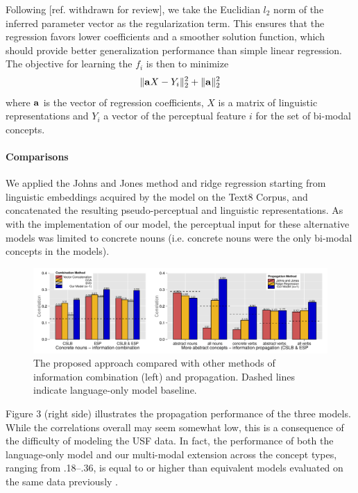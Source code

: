 \documentclass[11pt]{article}
\begin{document}
Following [ref. withdrawn for review], we take the Euclidian \( l_2 \) norm of the inferred parameter vector as the regularization term. This ensures that the regression favors lower coefficients and a smoother solution function, which should provide better generalization performance than simple linear regression. The objective for learning the \( f_i \) is then to minimize \[ \| {\bf a}X - Y_i \|_2^2 + \|{\bf a}\|_2^2 \]where \( {\bf a}\) is the vector of regression coefficients, \( X \) is a matrix of linguistic representations and \(  Y_i \) a vector of the perceptual feature \(i\) for the set of bi-modal concepts.

\paragraph{Comparisons}We applied the Johns and Jones method and ridge regression starting from linguistic embeddings acquired by the  model on the Text8 Corpus, and concatenated the resulting pseudo-perceptual and linguistic representations. As with the implementation of our model, the perceptual input for these alternative models was limited to concrete nouns (i.e. concrete nouns were the only bi-modal concepts in the models).

 \begin{figure}  \includegraphics[width = \textwidth]{Graph_1}  \caption{The proposed approach compared with other methods of information combination (left) and propagation. Dashed lines indicate language-only model baseline.}\end{figure}

Figure 3 (right side) illustrates the propagation performance of the three models. While the correlations overall may seem somewhat low, this is a consequence of the difficulty of modeling the USF data. In fact, the performance of both the language-only model and our multi-modal extension across the concept types, ranging from .18--.36, is equal to or higher than equivalent models evaluated on the same data previously \cite{feng2010visual,silberer2012grounded,silberer2013models}. 
\end{document}
